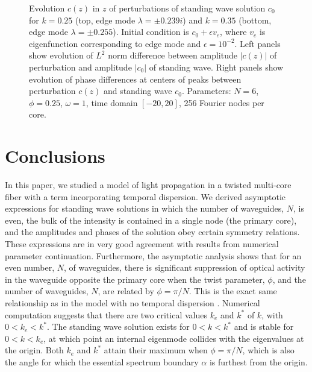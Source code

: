 \documentclass[11pt,reqno]{amsart}
\begin{document}
\begin{figure}
    \caption{Evolution $c(z)$ in $z$ of perturbations of standing wave solution $c_0$ for $k = 0.25$ (top, edge mode $\lambda = \pm 0.239i$) and $k = 0.35$ (bottom, edge mode $\lambda = \pm 0.255$). Initial condition is $c_0 + \epsilon v_e$, where $v_e$ is eigenfunction corresponding to edge mode and $\epsilon = 10^{-2}$. Left panels show evolution of $L^2$ norm difference between amplitude $|c(z)|$ of perturbation and amplitude $|c_0|$ of standing wave. Right panels show evolution of phase differences at centers of peaks between perturbation $c(z)$ and standing wave $c_0$. Parameters: $N=6$, $\phi = 0.25$, $\omega=1$, time domain $[-20,20]$, 256 Fourier nodes per core.}
    \label{fig:evolz1}
\end{figure}

\section{Conclusions}

In this paper, we studied a model of light propagation in a twisted multi-core fiber with a term incorporating temporal dispersion. We derived asymptotic expressions for standing wave solutions in which the number of waveguides, $N$, is even, the bulk of the intensity is contained in a single node (the primary core), and the amplitudes and phases of the solution obey certain symmetry relations. These expressions are in very good agreement with results from numerical parameter continuation. Furthermore, the asymptotic analysis shows that for an even number, $N$, of waveguides, there is significant suppression of optical activity in the waveguide opposite the primary core when the twist parameter, $\phi$, and the number of waveguides, $N$, are related by $\phi = \pi/N$. This is the exact same relationship as in the model with no temporal dispersion \cite{parker2021}.
Numerical computation suggests that there are two critical values $k_e$ and $k^*$ of $k$, with $0 < k_e < k^*$. The standing wave solution exists for $0 < k < k^*$ and is stable for $0 < k < k_e$, at which point an internal eigenmode collides with the eigenvalues at the origin. Both $k_e$ and $k^*$ attain their maximum when $\phi = \pi/N$, which is also the angle for which the essential spectrum boundary $\alpha$ is furthest from the origin.
\end{document}
